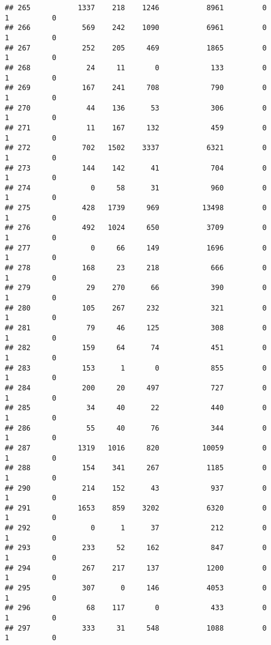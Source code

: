 \documentclass[
]{article}
\begin{document}
\begin{verbatim}
## 265           1337    218    1246           8961         0         1          0
## 266            569    242    1090           6961         0         1          0
## 267            252    205     469           1865         0         1          0
## 268             24     11       0            133         0         1          0
## 269            167    241     708            790         0         1          0
## 270             44    136      53            306         0         1          0
## 271             11    167     132            459         0         1          0
## 272            702   1502    3337           6321         0         1          0
## 273            144    142      41            704         0         1          0
## 274              0     58      31            960         0         1          0
## 275            428   1739     969          13498         0         1          0
## 276            492   1024     650           3709         0         1          0
## 277              0     66     149           1696         0         1          0
## 278            168     23     218            666         0         1          0
## 279             29    270      66            390         0         1          0
## 280            105    267     232            321         0         1          0
## 281             79     46     125            308         0         1          0
## 282            159     64      74            451         0         1          0
## 283            153      1       0            855         0         1          0
## 284            200     20     497            727         0         1          0
## 285             34     40      22            440         0         1          0
## 286             55     40      76            344         0         1          0
## 287           1319   1016     820          10059         0         1          0
## 288            154    341     267           1185         0         1          0
## 290            214    152      43            937         0         1          0
## 291           1653    859    3202           6320         0         1          0
## 292              0      1      37            212         0         1          0
## 293            233     52     162            847         0         1          0
## 294            267    217     137           1200         0         1          0
## 295            307      0     146           4053         0         1          0
## 296             68    117       0            433         0         1          0
## 297            333     31     548           1088         0         1          0

\end{verbatim}
\end{document}
